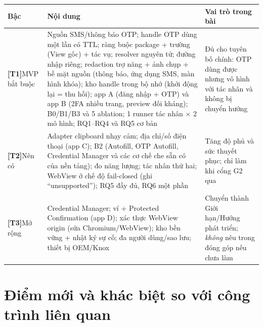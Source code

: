 \documentclass[11pt,a4paper]{article}
\newcommand{\Tone}{\textbf{\color{shgreen}[T1]}}
\newcommand{\Ttwo}{\textbf{\color{shblue}[T2]}}
\newcommand{\Tthree}{\textbf{\color{shgray}[T3]}}
\begin{document}
\begin{longtable}{@{}p{1.3cm}p{9.4cm}p{4.4cm}@{}}
\toprule
\textbf{Bậc} & \textbf{Nội dung} & \textbf{Vai trò trong bài} \\
\midrule
\endhead
\Tone\newline MVP bắt buộc &
Nguồn SMS/thông báo OTP; handle OTP dùng một lần có TTL; ràng buộc package + trường (View gốc) + tác vụ;
resolver nguyên tử; đường nhập riêng; redaction trợ năng + ảnh chụp + bề mặt nguồn (thông báo, ứng dụng SMS,
màn hình khóa); kho handle trong bộ nhớ (khởi động lại = thu hồi); app A (đăng nhập + OTP) và app B (2FA nhiều trang,
preview đối kháng); B0/B1/B3 và 5 ablation; 1 runner tác nhân $\times$ 2 mô hình; RQ1--RQ4 và RQ5 cơ bản &
Đủ cho tuyên bố chính: OTP dùng được nhưng vô hình với tác nhân và không bị chuyển hướng \\
\addlinespace
\Ttwo\newline Nên có &
Adapter clipboard nhạy cảm; địa chỉ/số điện thoại (app C); B2 (Autofill, OTP Autofill, Credential Manager và các cơ chế che sẵn có
của nền tảng); đo năng lượng; tác nhân thứ hai; WebView ở chế độ fail-closed (ghi ``unsupported''); RQ5 đầy đủ, RQ6 một phần &
Tăng độ phủ và sức thuyết phục; chỉ làm khi cổng G2 qua \\
\addlinespace
\Tthree\newline Mở rộng &
Credential Manager; ví + Protected Confirmation (app D); xác thực WebView origin (sửa Chromium/WebView); kho bền vững + nhật ký sự cố;
đa người dùng/sao lưu; thiết bị OEM/Knox &
Chuyển thành Giới hạn/Hướng phát triển; \emph{không} nêu trong đóng góp nếu chưa làm \\
\bottomrule
\end{longtable}

\section{Điểm mới và khác biệt so với công trình liên quan}
\end{document}
